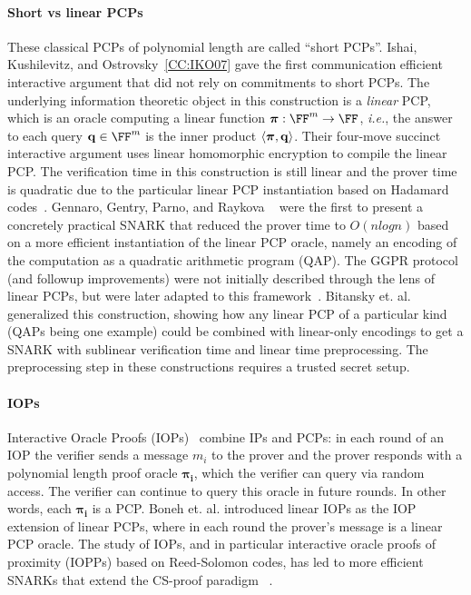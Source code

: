 \paragraph{Short vs linear PCPs} These classical PCPs of polynomial length are called ``short PCPs''. Ishai, Kushilevitz, and Ostrovsky~\ref{CC:IKO07} gave the first communication efficient interactive argument that did not rely on commitments to short PCPs. The underlying information theoretic object in this construction is a \emph{linear} PCP, which is an oracle computing a linear function $\proofO: \FF^m \rightarrow \FF$, \emph{i.e.}, the answer to each query $\mathbf{q} \in \FF^m$ is the inner product $\langle \boldsymbol{\pi}, \mathbf{q} \rangle$. Their four-move succinct interactive argument uses linear homomorphic encryption to compile the linear PCP. The verification time in this construction is still linear and the prover time is quadratic due to the particular linear PCP instantiation based on Hadamard codes~\cite{FOCS:ALMSS92}. Gennaro, Gentry, Parno, and Raykova ~\cite{EC:GGPR13} were the first to present a concretely practical SNARK that reduced the prover time to $O(n log n)$ based on a more efficient instantiation of the linear PCP oracle, namely an encoding of the computation as a quadratic arithmetic program (QAP). The GGPR protocol (and followup improvements) were not initially described through the lens of linear PCPs, but were later adapted to this framework~\cite{TCC:BCIOP13,ES:SBVBPW13}. Bitansky et. al.~\cite{TCC:BCIOP13} generalized this construction, showing how any linear PCP of a particular kind (QAPs being one example) could be combined with linear-only encodings to get a SNARK with sublinear verification time and linear time preprocessing. The preprocessing step in these constructions requires a trusted secret setup. 

\paragraph{IOPs} Interactive Oracle Proofs (IOPs)~\cite{TCC:BenChiSpo16,STOC:ReiRotRot16} combine IPs and PCPs: in each round of an IOP the verifier sends a message $m_i$ to the prover and the prover responds with a polynomial length proof oracle $\boldsymbol{\pi_i}$, which the verifier can query via random access. The verifier can continue to query this oracle in future rounds. In other words, each $\boldsymbol{\pi_i}$ is a PCP. Boneh et. al. \cite{C:BBCGI19} introduced linear IOPs as the IOP extension of linear PCPs, where in each round the prover's message is a linear PCP oracle. The study of IOPs, and in particular interactive oracle proofs of proximity (IOPPs) based on Reed-Solomon codes, has led to more efficient SNARKs that extend the CS-proof paradigm ~\cite{ICALP:BBHR18}.

